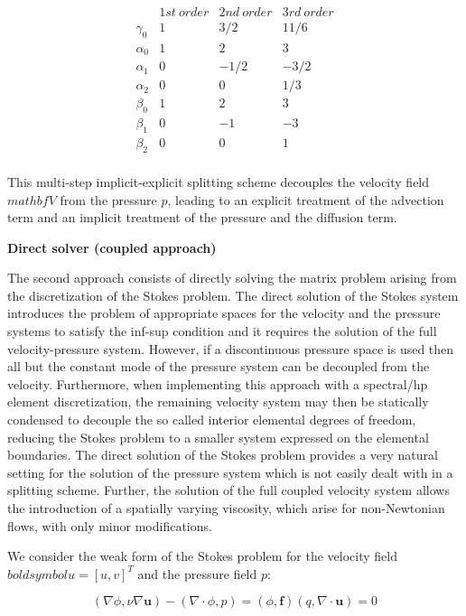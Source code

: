 \begin{equation}
 \begin{array}{cccc}
  & 1st\ order & 2nd\ order & 3rd\ order \\
 \gamma_0 & 1 & 3/2 & 11/6\\
 \alpha_0 & 1 & 2 & 3\\
 \alpha_1 & 0 & -1/2 & -3/2\\
 \alpha_2 & 0 & 0 & 1/3\\
 \beta_0 & 1 & 2 & 3\\
 \beta_1 & 0 & -1 & -3\\
 \beta_2 & 0 & 0 & 1\\
 \end{array}
 \end{equation}
 
 This multi-step implicit-explicit splitting scheme decouples the velocity field $mathbf{V}$ from the pressure $p$, leading to an
explicit treatment of the advection term and an implicit treatment of the pressure and the diffusion term.

\textbf{Direct solver (coupled approach)}

The second approach consists of directly solving the matrix problem arising from the discretization of the Stokes problem. 
The direct solution of the Stokes system introduces the problem of appropriate spaces for the velocity and the pressure systems to satisfy the inf-sup condition and it requires the solution of the full velocity-pressure system. However, if a discontinuous pressure space is used then all but the constant mode of the pressure system can be decoupled from the velocity. Furthermore, when implementing this approach with a spectral/hp element discretization, the remaining velocity system may then be statically condensed to decouple the so called interior elemental degrees of freedom, reducing the Stokes problem to a smaller system expressed on the elemental boundaries. The direct solution of the Stokes problem provides a very natural setting for the solution of the pressure system which is not easily dealt with in a splitting scheme. Further, the solution of the full coupled velocity system allows the introduction of a spatially varying viscosity, which arise for non-Newtonian flows, with only minor modifications.

We consider the weak form of the Stokes problem for the velocity field $boldsymbol{u}=[u,v]^{T}$ and the pressure field $p$:

\begin{subequations}
\begin{equation}
 (\nabla \phi,\nu \nabla \boldsymbol{u}) - (\nabla\cdot\phi,p)=(\phi,\boldsymbol{f})
\end{equation}
\begin{equation}
 (q,\nabla \cdot \boldsymbol{u}) = 0
\end{equation}
\end{subequations}

